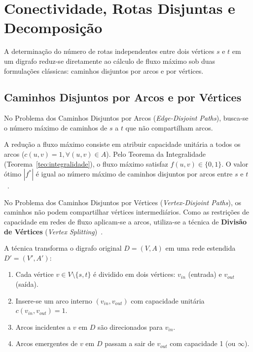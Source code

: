 \chapter{Conectividade, Rotas Disjuntas e Decomposição}\label{sec:conectividade_roteamento}

A determinação do número de rotas independentes entre dois vértices $s$ e $t$ em um digrafo reduz-se diretamente ao cálculo de fluxo máximo sob duas formulações clássicas: caminhos disjuntos por arcos e por vértices.


\section{Caminhos Disjuntos por Arcos e por Vértices}\label{sec:caminhos_disjuntos}

No Problema dos Caminhos Disjuntos por Arcos (\textit{Edge-Disjoint Paths}), busca-se o número máximo de caminhos de $s$ a $t$ que não compartilham arcos.

A redução a fluxo máximo consiste em atribuir capacidade unitária a todos os arcos ($c(u,v) = 1, \forall (u,v) \in A$). Pelo Teorema da Integralidade (Teorema~\ref{teo:integralidade}), o fluxo máximo satisfaz $f(u,v) \in \{0, 1\}$. O valor ótimo $|f^*|$ é igual ao número máximo de caminhos disjuntos por arcos entre $s$ e $t$~\cite{cook1998combinatorial}.

No Problema dos Caminhos Disjuntos por Vértices (\textit{Vertex-Disjoint Paths}), os caminhos não podem compartilhar vértices intermediários. Como as restrições de capacidade em redes de fluxo aplicam-se a arcos, utiliza-se a técnica de \textbf{Divisão de Vértices} (\textit{Vertex Splitting})~\cite{ahuja1993network}.

A técnica transforma o digrafo original $D = (V, A)$ em uma rede estendida $D' = (V', A')$:
\begin{enumerate}
    \item Cada vértice $v \in V \setminus \{s, t\}$ é dividido em dois vértices: $v_{in}$ (entrada) e $v_{out}$ (saída).
    \item Insere-se um arco interno $(v_{in}, v_{out})$ com capacidade unitária $c(v_{in}, v_{out}) = 1$.
    \item Arcos incidentes a $v$ em $D$ são direcionados para $v_{in}$.
    \item Arcos emergentes de $v$ em $D$ passam a sair de $v_{out}$ com capacidade 1 (ou $\infty$).
\end{enumerate}

